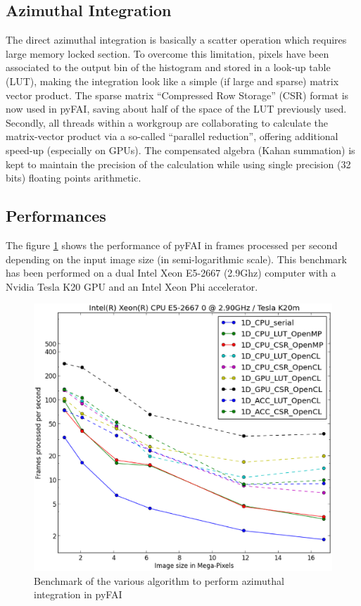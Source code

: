\documentclass[preprint]{iucr}
\begin{document}
\subsection{Azimuthal Integration}
The direct azimuthal integration is basically a scatter operation which
requires large memory locked section.
To overcome this limitation, pixels have been
associated to the output bin of the histogram and stored in a look-up
table (LUT), making the integration look like a simple (if large and sparse)
matrix vector product.
The sparse matrix ``Compressed Row Storage'' (CSR) format is now used in pyFAI,
saving about half of the space of the LUT previously used.
Secondly, all threads within a workgroup are collaborating to calculate the
matrix-vector product via a so-called ``parallel reduction'', offering
additional speed-up (especially on GPUs).
The compensated algebra (Kahan summation) is kept to maintain the precision
of the calculation while using single precision (32 bits) floating points
arithmetic.

\subsection{Performances}
The figure \ref{benchmark} shows the performance of pyFAI in frames processed per
second depending on the input image size (in semi-logarithmic scale).
This benchmark has been performed on a dual Intel Xeon E5-2667 (2.9Ghz) computer
with a Nvidia Tesla K20 GPU and an Intel Xeon Phi accelerator.

\begin{figure}
\label{benchmark}
\begin{center}
\includegraphics[width=15cm]{benchmark.eps}
\caption{Benchmark of the various algorithm to perform azimuthal integration in
pyFAI}
\end{center}
\end{figure}
\end{document}
